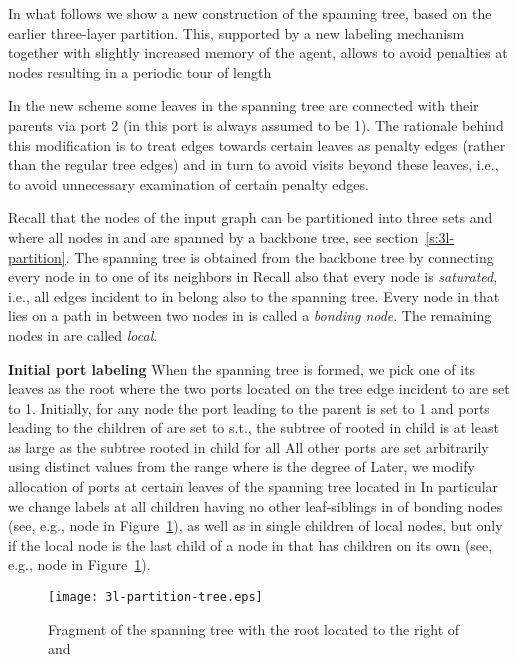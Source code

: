 \documentclass[11pt,envcountsame,oribibl]{llncs}
\begin{document}
In what follows we show a new construction of the spanning tree, based
on the earlier three-layer partition. This, supported by a new labeling
mechanism together with slightly
increased memory of the agent, allows to avoid penalties at
 nodes resulting in a periodic tour of length

In the new scheme some leaves in the spanning tree are connected with
their parents
via port 2 (in \cite{GKMNZ08} this port is always assumed to be 1). The
rationale behind
this modification is to treat edges towards certain leaves as penalty
edges (rather than
the regular tree edges) and in turn to avoid visits beyond these leaves,
i.e., to avoid
unnecessary examination of certain penalty edges.

Recall that the nodes of the input graph can be partitioned into three sets
 and  where
all nodes in  and  are spanned by a backbone tree, see
section~\ref{s:3l-partition}.
The spanning tree  is obtained from the backbone tree by connecting
every node in 
to one of its neighbors in  Recall also that every node  is
{\sl saturated}, i.e.,
all edges incident to  in  belong also to the spanning tree.
Every node in  that lies on a path in  between two nodes in 
is called a {\sl bonding node}. The remaining nodes in 
are called {\sl local}.


\noindent
{\bf Initial port labeling}
When the spanning tree  is formed, we pick one of its leaves as the
root  where the two ports located on the tree edge
incident to 
are set to 1. Initially, for any node  the port leading to the parent
is set to 1 and ports
leading to the  children of  are set to  s.t., the subtree
of  rooted in child 
is at least as large as the subtree rooted in child  for all 
All other ports are set arbitrarily using distinct values from the range
 where  is the degree of 
Later, we modify allocation of ports at certain leaves of the spanning
tree located in 
In particular we change labels at all children having no other
leaf-siblings in  of bonding nodes
(see, e.g., node  in Figure~\ref{f:w1w2}), as well as in single
children of local nodes,
but only if the local node is the last child of a node in  that has
children on its own (see, e.g., node  in Figure~\ref{f:w1w2}).

\begin{figure}
\begin{center}
\texttt{[image: 3l-partition-tree.eps]}
\end{center}
\caption{Fragment of the spanning tree with the root
located to the right of  and \label{f:w1w2}}
\end{figure}
\end{document}
